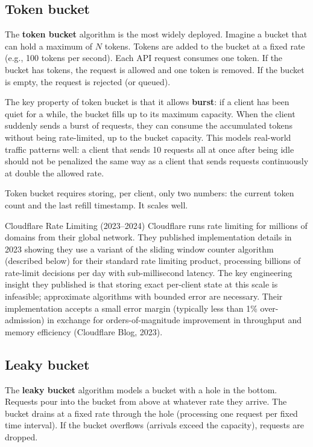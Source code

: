 \documentclass[11pt,a4paper]{article}
\begin{document}
\subsection{Token bucket}

The \textbf{token bucket} algorithm is the most widely deployed. Imagine a bucket that can hold a maximum of $N$ tokens. Tokens are added to the bucket at a fixed rate (e.g., 100 tokens per second). Each API request consumes one token. If the bucket has tokens, the request is allowed and one token is removed. If the bucket is empty, the request is rejected (or queued).

The key property of token bucket is that it allows \textbf{burst}: if a client has been quiet for a while, the bucket fills up to its maximum capacity. When the client suddenly sends a burst of requests, they can consume the accumulated tokens without being rate-limited, up to the bucket capacity. This models real-world traffic patterns well: a client that sends 10 requests all at once after being idle should not be penalized the same way as a client that sends requests continuously at double the allowed rate.

Token bucket requires storing, per client, only two numbers: the current token count and the last refill timestamp. It scales well.

\begin{industrybox}{Cloudflare Rate Limiting (2023--2024)}
Cloudflare runs rate limiting for millions of domains from their global network. They published implementation details in 2023 showing they use a variant of the sliding window counter algorithm (described below) for their standard rate limiting product, processing billions of rate-limit decisions per day with sub-millisecond latency. The key engineering insight they published is that storing exact per-client state at this scale is infeasible; approximate algorithms with bounded error are necessary. Their implementation accepts a small error margin (typically less than 1\% over-admission) in exchange for orders-of-magnitude improvement in throughput and memory efficiency (Cloudflare Blog, 2023).
\end{industrybox}

\subsection{Leaky bucket}

The \textbf{leaky bucket} algorithm models a bucket with a hole in the bottom. Requests pour into the bucket from above at whatever rate they arrive. The bucket drains at a fixed rate through the hole (processing one request per fixed time interval). If the bucket overflows (arrivals exceed the capacity), requests are dropped.
\end{document}
